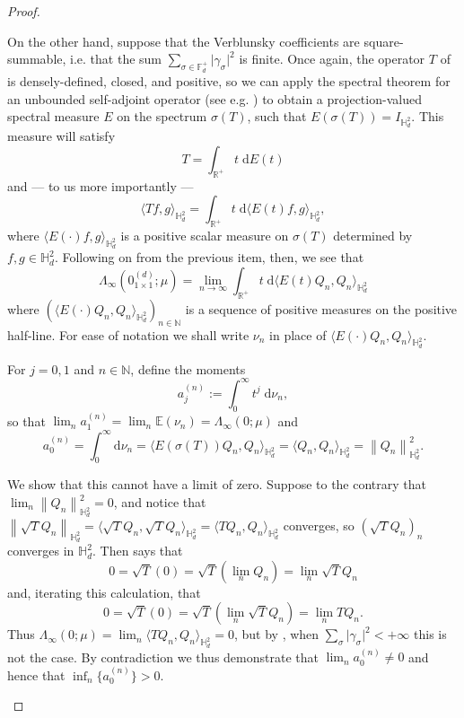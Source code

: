 \documentclass[11pt,reqno]{amsart}
\newcommand\norm[1]{\left\lVert#1\right\rVert}
\newcommand\ip[2]{\langle#1,#2\rangle}
\def\g{\gamma}
\def\s{\sigma}
\def\L{\Lambda}
\def\rmd{\mathrm{d}}
\def\NN{\mathbb{N}}
\def\RR{\mathbb{R}}
\def\FF{\mathbb{F}}
\def\HH{\mathbb{H}}
\theoremstyle{definition}
\numberwithin{equation}{section}
\begin{document}
\begin{proof}
\begin{enumerate}[align=left]
        On the other hand, suppose that the Verblunsky coefficients are square-summable, i.e. that the sum \(\sum_{\s \in \FF_d^+} \lvert \g_\s \rvert^2\) is finite. Once again, the operator \(T\) of \cite{JM22a} is densely-defined, closed, and positive, so we can apply the spectral theorem for an unbounded self-adjoint operator (see e.g. \cite[Theorem 5.8]{Sch12}) to obtain a projection-valued spectral measure \(E\) on the spectrum \(\s(T)\), such that \(E(\s(T)) = I_{\HH_d^2}\). This measure will satisfy
        \[
            T = \int_{\RR^+} t \; \rmd E(t)
        \]
        and --- to us more importantly ---
        \[
            \ip{Tf}{g}_{\HH^2_d} = \int_{\RR^+} t \; \rmd \ip{E(t)f}{g}_{\HH^2_d},
        \]
        where \(\ip{E(\cdot)f}{g}_{\HH^2_d}\) is a positive scalar measure on \(\s(T)\) determined by \(f,g \in \HH^2_d\). Following on from the previous item, then, we see that
        \[
            \L_{\infty}(0_{1 \times 1}^{(d)}; \mu) = \lim_{n\to\infty} \int_{\RR^+} t \; \rmd \ip{E(t)Q_n}{Q_n}_{\HH^2_d}
        \]
        where \((\ip{E(\cdot)Q_n}{Q_n}_{\HH^2_d})_{n\in\NN}\) is a sequence of positive measures on the positive half-line. For ease of notation we shall write \(\nu_n\) in place of \(\ip{E(\cdot)Q_n}{Q_n}_{\HH^2_d}\).

        For \(j = 0,1\) and \(n \in \NN\), define the moments
        \[
            a_j^{(n)} := \int_0^{\infty} t^{j} \; \rmd \nu_n,
        \]
        so that \(\lim_n a_1^{(n)} = \lim_n \mathbb{E}(\nu_n) = \L_{\infty}(0; \mu)\) and
        \[
            a_0^{(n)} = \int_0^{\infty} \rmd \nu_n = \langle E(\s(T))Q_n, Q_n \rangle_{\HH_d^2} = \langle Q_n, Q_n \rangle_{\HH_d^2} = \norm{Q_n}^2_{\HH_d^2}.
        \]
        
        We show that this cannot have a limit of zero. Suppose to the contrary that \(\lim_n \norm{Q_n}^2_{\HH_d^2} = 0\), and notice that \(\norm{\sqrt{T}Q_n}_{\HH_d^2} = \langle \sqrt{T}Q_n, \sqrt{T}Q_n\rangle_{\HH_d^2} = \langle TQ_n, Q_n \rangle_{\HH_d^2}\) converges, so \((\sqrt{T}Q_n)_n\) converges in \(\HH_d^2\). Then \cite[Proposition 1.4]{Sch12} says that 
        \[
            0 = \sqrt{T}(0) = \sqrt{T}\left(\lim_n Q_{n}\right) = \lim_n \sqrt{T}Q_{n}
        \]
        and, iterating this calculation, that
        \[
            0 = \sqrt{T}(0) = \sqrt{T}\left(\lim_n \sqrt{T}Q_{n}\right) = \lim_n TQ_{n}.
        \]
        Thus \(\L_{\infty}(0; \mu) = \lim_n \langle TQ_{n}, Q_{n} \rangle_{\HH_d^2} = 0\), but by , when \(\sum_{\s} \lvert \g_{\s} \rvert^2 < +\infty\) this is not the case. By contradiction we thus demonstrate that \(\lim_n a_0^{(n)} \neq 0\) and hence that \(\inf_n \{a_0^{(n)}\} > 0\).


\end{enumerate}
\end{proof}
\end{document}
